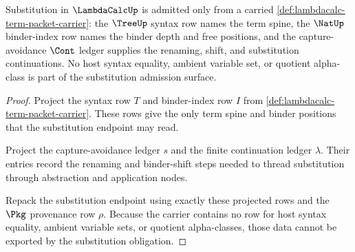 \begin{theorem}
\label{thm:lambdacalc-substitution-ledger-obligation}
Substitution in $\LambdaCalcUp$ is admitted only from a carried
\autoref{def:lambdacalc-term-packet-carrier}: the $\TreeUp$ syntax row names
the term spine, the $\NatUp$ binder-index row names the binder depth and free
positions, and the capture-avoidance $\Cont$ ledger supplies the renaming,
shift, and substitution continuations. No host syntax equality, ambient
variable set, or quotient alpha-class is part of the substitution admission
surface.
\end{theorem}
\begin{proof}
Project the syntax row $T$ and binder-index row $I$ from
\autoref{def:lambdacalc-term-packet-carrier}. These rows give the only term
spine and binder positions that the substitution endpoint may read.

Project the capture-avoidance ledger $s$ and the finite continuation ledger
$\lambda$. Their entries record the renaming and binder-shift steps needed to
thread substitution through abstraction and application nodes.

Repack the substitution endpoint using exactly these projected rows and the
$\Pkg$ provenance row $\rho$. Because the carrier contains no row for host
syntax equality, ambient variable sets, or quotient alpha-classes, those data
cannot be exported by the substitution obligation.
\end{proof}

